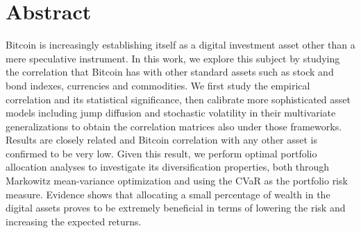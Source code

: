 \chapter{Abstract}
\label{chpr:abstract}

Bitcoin is increasingly establishing itself as a digital investment asset other than a mere speculative instrument. In this work, we explore this subject by studying the correlation that Bitcoin has with other standard assets such as stock and bond indexes,  currencies and commodities. We first study the empirical correlation and its statistical significance, then calibrate more sophisticated asset models including jump diffusion and stochastic volatility in their multivariate generalizations to obtain the correlation matrices also under those frameworks. Results are closely related and Bitcoin correlation  with any other asset is confirmed to be very low. Given this result, we perform optimal portfolio allocation analyses to investigate its diversification properties, both through Markowitz mean-variance optimization and using the CVaR as the portfolio risk measure. Evidence shows that allocating a small percentage of wealth in the digital assets proves to be extremely beneficial in terms of lowering the risk and increasing the expected returns.


